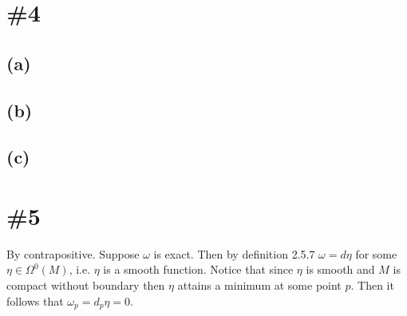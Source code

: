 \documentclass{article}
\begin{document}
\section*{\#4}
\subsection*{(a)}
\subsection*{(b)}
\subsection*{(c)}
\section*{\#5}

By contrapositive. Suppose $\omega$ is exact. Then by definition 2.5.7
$\omega=d\eta$ for some $\eta\in\Omega^0(M)$, i.e. $\eta$ is a smooth function. Notice that since $\eta$ is smooth and $M$ is compact without boundary then $\eta$ attains a minimum at some point $p$. Then it follows that $\omega_p=d_p\eta=0$.
\end{document}
